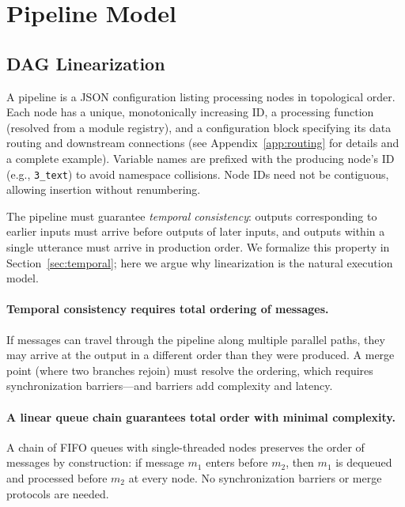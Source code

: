 \documentclass[11pt,a4paper]{article}
\begin{document}
\section{Pipeline Model}
\label{sec:pipeline}

\subsection{DAG Linearization}
\label{sec:linearization}

A pipeline is a JSON configuration listing processing nodes in topological order. Each node has a unique, monotonically increasing ID, a processing function (resolved from a module registry), and a configuration block specifying its data routing and downstream connections (see Appendix~\ref{app:routing} for details and a complete example). Variable names are prefixed with the producing node's ID (e.g., \texttt{3\_text}) to avoid namespace collisions. Node IDs need not be contiguous, allowing insertion without renumbering.

The pipeline must guarantee \emph{temporal consistency}: outputs corresponding to earlier inputs must arrive before outputs of later inputs, and outputs within a single utterance must arrive in production order. We formalize this property in Section~\ref{sec:temporal}; here we argue why linearization is the natural execution model.

\paragraph{Temporal consistency requires total ordering of messages.}
If messages can travel through the pipeline along multiple parallel paths, they may arrive at the output in a different order than they were produced. A merge point (where two branches rejoin) must resolve the ordering, which requires synchronization barriers---and barriers add complexity and latency.

\paragraph{A linear queue chain guarantees total order with minimal complexity.}
A chain of FIFO queues with single-threaded nodes preserves the order of messages by construction: if message $m_1$ enters before $m_2$, then $m_1$ is dequeued and processed before $m_2$ at every node. No synchronization barriers or merge protocols are needed.
\end{document}
